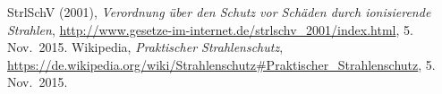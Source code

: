 \documentclass[german,  %
parskip=full,  %
]{scrartcl}
\begin{document}
    \begin{thebibliography}{9}
    StrlSchV (2001),
    \emph{Verordnung über den Schutz vor Schäden durch ionisierende Strahlen},
    \url{http://www.gesetze-im-internet.de/strlschv_2001/index.html},
    5.\,Nov.~2015.
    Wikipedia,
    \emph{Praktischer Strahlenschutz},
    \url{https://de.wikipedia.org/wiki/Strahlenschutz#Praktischer_Strahlenschutz},
    5.\,Nov.~2015.
    \end{thebibliography}

\end{document}
